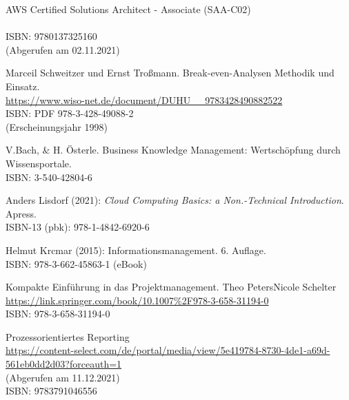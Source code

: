 \begin{thebibliography}{SW11} %
   AWS Certified Solutions Architect - Associate (SAA-C02)\\
  \\ISBN: 9780137325160
  \\(Abgerufen am 02.11.2021)
  
  
   Marceil Schweitzer und Ernst Troßmann. Break-even-Analysen Methodik und Einsatz.\\
  \url{https://www.wiso-net.de/document/DUHU__9783428490882522}\\  
  ISBN: PDF 978-3-428-49088-2\\
  (Erscheinungsjahr 1998)
  
   V.Bach, \& H. Österle. Business Knowledge Management: Wertschöpfung durch Wissensportale.\\
  ISBN: 3-540-42804-6
 
   Anders Lisdorf (2021): \textit{Cloud Computing Basics: a Non.-Technical Introduction}. Apress.\\ 
  ISBN-13 (pbk): 978-1-4842-6920-6 
  
 Helmut Krcmar (2015): Informationsmanagement. 6. Auflage.\\ 
  ISBN: 978-3-662-45863-1 (eBook)
  
   Kompakte Einführung in das Projektmanagement. Theo PetersNicole Schelter
  \url{https://link.springer.com/book/10.1007%2F978-3-658-31194-0}
  \\ISBN: 978-3-658-31194-0

   Prozessorientiertes Reporting \\
  \url{https://content-select.com/de/portal/media/view/5e419784-8730-4de1-a69d-561eb0dd2d03?forceauth=1}\\
  (Abgerufen am 11.12.2021)\\
  ISBN: 9783791046556
\end{thebibliography}

